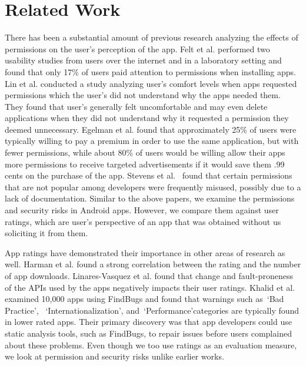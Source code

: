 \section{Related Work}
\label{sec:relatedwork}



There has been a substantial amount of previous research analyzing the effects of permissions on the user's perception of the app. Felt et al.\cite{Felt:2012:APU:2335356.2335360} performed two usability studies from users over the internet and in a laboratory setting and found that only 17\% of users paid attention to permissions when installing apps. Lin et al.\cite{Lin:2012:EPU:2370216.2370290} conducted a study analyzing user's comfort levels when apps requested permissions which the user's did not understand why the apps needed them. They found that user's generally felt uncomfortable and may even delete applications when they did not understand why it requested a permission they deemed unnecessary. Egelman et al.\cite{Egelman12choicearchitecture} found that approximately 25\% of users were typically willing to pay a premium in order to use the same application, but with fewer permissions, while about 80\% of users would be willing allow their apps more permissions to receive targeted advertisements if it would save them .99 cents on the purchase of the app. Stevens et al.~\cite{Stevens2013} found that certain permissions that are not popular among developers were frequently misused, possibly due to a lack of documentation. Similar to the above papers, we examine the permissions and security risks in Android apps. However, we compare them against user ratings, which are user's perspective of an app that was obtained without us soliciting it from them. 


App ratings have demonstrated their importance in other areas of research as well. Harman et al.\cite{6224306} found a strong correlation between the rating and the number of app downloads. Linares-Vasquez et al.\cite{Linares-Vasquez:2013:ACF:2491411.2491428} found that change and fault-proneness of the APIs used by the apps negatively impacts their user ratings. Khalid et al.\cite{Khalid_Mei_Examinging} examined 10,000 apps using FindBugs and found that warnings such as~\lq Bad Practice\rq, ~\lq Internationalization\rq, and~\lq Performance\rq categories are typically found in lower rated apps. Their primary discovery was that app developers could use static analysis tools, such as FindBugs, to repair issues before users complained about these problems. Even though we too use ratings as an evaluation measure, we look at permission and security risks unlike earlier works. 


